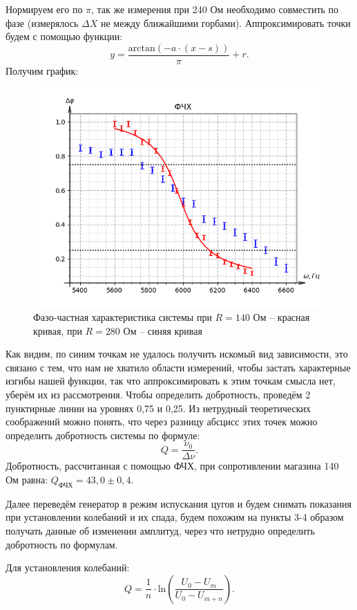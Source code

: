 \documentclass[a4paper,12pt]{extarticle}
\begin{document}
Нормируем его по $\pi$, так же измерения при 240 Ом необходимо совместить по фазе (измерялось $\Delta X$ не между ближайшими горбами). Аппроксимировать точки будем с помощью функции: $$y = \frac{\text{arctan}(-a\cdot (x - s))}{\pi} + r.$$ Получим график:

\begin{figure}[h!]
    \centering
    \includegraphics[width=0.8\linewidth]{FCHH.png}
    \caption{Фазо-частная характеристика системы при $R = 140$ Ом -- красная кривая, при $R = 280$ Ом -- синяя кривая}
\end{figure}

Как видим, по синим точкам не удалось получить искомый вид зависимости, это связано с тем, что нам не хватило области измерений, чтобы застать характерные изгибы нашей функции, так что аппроксимировать к этим точкам смысла нет, уберём их из рассмотрения. Чтобы определить добротность, проведём 2 пунктирные линии на уровнях 0,75 и 0,25. Из нетрудный теоретических соображений можно понять, что через разницу абсцисс этих точек можно определить добротность системы по формуле:
\begin{equation}
    Q = \frac{\nu_0}{\Delta \nu}.
\end{equation}
Добротность, рассчитанная с помощью ФЧХ, при сопротивлении магазина 140 Ом равна: $Q_\text{ФЧХ} = 43,0 \pm 0,4.$


Далее переведём генератор в режим испускания цугов и будем снимать показания при установлении колебаний и их спада, будем похожим на пункты 3-4 образом получать данные об изменении амплитуд, через что нетрудно определить добротность по формулам.

Для установления колебаний:
\begin{equation}
    Q = \frac{1}{n} \cdot \text{ln}(\frac{U_0 - U_m}{U_0 - U_{m+n}}).
\end{equation}
\end{document}
